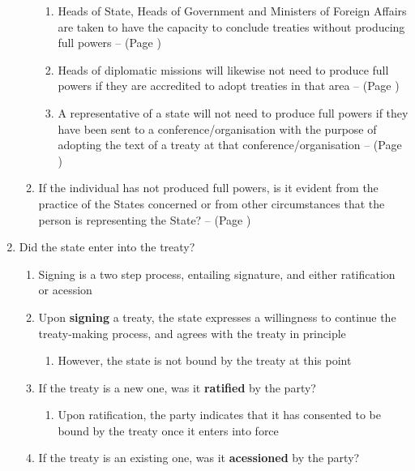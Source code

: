 \begin{enumerate}
\begin{enumerate}
\begin{enumerate}
            \item Heads of State, Heads of Government and Ministers of Foreign Affairs are taken to have the capacity to conclude treaties without producing full powers --  (Page \pageref{VCLT Art 2})
            \item Heads of diplomatic missions will likewise not need to produce full powers if they are accredited to adopt treaties in that area --  (Page \pageref{VCLT Art 2})
            \item A representative of a state will not need to produce full powers if they have been sent to a conference/organisation with the purpose of adopting the text of a treaty at that conference/organisation --  (Page \pageref{VCLT Art 2})
        \end{enumerate}
        \item If the individual has not produced full powers, is it evident from the practice of the States concerned or from other circumstances that the person is representing the State? --  (Page \pageref{VCLT Art 2})
    \end{enumerate}
    \item Did the state enter into the treaty?
    \begin{enumerate}
        \item Signing is a two step process, entailing signature, and either ratification or acession
        \item Upon \textbf{signing} a treaty, the state expresses a willingness to continue the treaty-making process, and agrees with the treaty in principle
        \begin{enumerate}
            \item However, the state is not bound by the treaty at this point
        \end{enumerate}
        \item If the treaty is a new one, was it \textbf{ratified} by the party?
        \begin{enumerate}
            \item Upon ratification, the party indicates that it has consented to be bound by the treaty once it enters into force
        \end{enumerate}
        \item If the treaty is an existing one, was it \textbf{acessioned} by the party?
        \begin{enumerate}

\end{enumerate}
\end{enumerate}
\end{enumerate}
